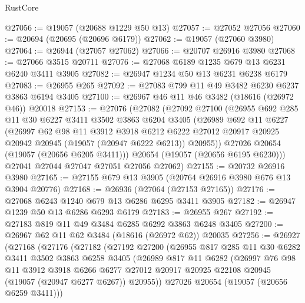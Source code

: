 \begin{lexlean}{RustCore}
\begin{coremodule}
@27056 := @19057 (@20688 @1229 @50 @13)
@27057 := @27052 @27056
@27060 := @20694 (@20695 (@20696 @6179))
@27062 := @19057 (@27060 @3980)
@27064 := @26944 (@27057 @27062)
@27066 := @20707 @26916 @3980
@27068 := @27066 @3515 @20711
@27076 := @27068 @6189 @1235 @679 @13 @6231 @6240 @3411 @3905
@27082 := @26947 @1234 @50 @13 @6231 @6238 @6179
@27083 := @26955 @265
@27092 := @27083 @799 @11 @49 @3482 @6230 @6237 @3863 @6194 @3405
@27100 := @26967 @46 @11 @46 @3482 (@18616 (@26972 @46)) @20018
@27153 := @27076
    (@27082
      (@27092
        @27100
        (@26955
          @692
          @285
          @11
          @30
          @6227
          @3411
          @3502
          @3863
          @6204
          @3405
          (@26989
            @692
            @11
            @6227
            (@26997
              @62
              @98
              @11
              @3912
              @3918
              @6212
              @6222
              @27012
              @20917
              @20925
              @20942
              @20945
              (@19057 (@20947 @6222 @6213))
              @20955))
          @27026
          @20654
          (@19057 (@20656 @6205 @3411)))
        @20654
        (@19057 (@20656 @6195 @6230)))
      @27041
      @27044
      @27047
      @27051
      @27056
      @27062)
@27155 := @20732 @26916 @3980
@27165 := @27155 @679 @13 @3905 (@20764 @26916 @3980 @676 @13 @3904 @20776)
@27168 := @26936 (@27064 (@27153 @27165))
@27176 := @27068 @6243 @1240 @679 @13 @6286 @6295 @3411 @3905
@27182 := @26947 @1239 @50 @13 @6286 @6293 @6179
@27183 := @26955 @267
@27192 := @27183 @819 @11 @49 @3484 @6285 @6292 @3863 @6248 @3405
@27200 := @26967 @62 @11 @62 @3484 (@18616 (@26972 @62)) @20035
@27256 := @26927
    (@27168
      (@27176
        (@27182
          (@27192
            @27200
            (@26955
              @817
              @285
              @11
              @30
              @6282
              @3411
              @3502
              @3863
              @6258
              @3405
              (@26989
                @817
                @11
                @6282
                (@26997
                  @76
                  @98
                  @11
                  @3912
                  @3918
                  @6266
                  @6277
                  @27012
                  @20917
                  @20925
                  @22108
                  @20945
                  (@19057 (@20947 @6277 @6267))
                  @20955))
              @27026
              @20654
              (@19057 (@20656 @6259 @3411)))

\end{coremodule}
\end{lexlean}
